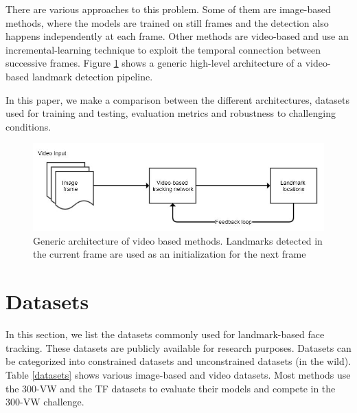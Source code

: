 \documentclass{llncs}
\begin{document}
There are various approaches to this problem. Some of them are image-based methods, where the models are trained on still frames and the detection also happens independently at each frame. Other methods are video-based and use an incremental-learning technique to exploit the temporal connection between successive frames. Figure \ref{generic_video_based} shows a generic high-level architecture of a video-based landmark detection pipeline.

In this paper, we make a comparison between the different architectures, datasets used for training and testing, evaluation metrics and robustness to challenging conditions. 

\begin{figure}[h!]
\centering
\includegraphics[scale=0.5]{Media/generic_video_based}
\caption{Generic architecture of video based methods. Landmarks detected in the current frame are used as an initialization for the next frame}
\label{generic_video_based}
\end{figure}

\section{Datasets}

In this section, we list the datasets commonly used for landmark-based face tracking. These datasets are publicly available for research purposes. Datasets can be categorized into constrained datasets and unconstrained datasets (in the wild).
Table \ref{datasets} shows various image-based and video datasets. Most methods use the 300-VW\cite{300-VW} and the TF\cite{tf} datasets to evaluate their models and compete in the 300-VW challenge. 
\end{document}
